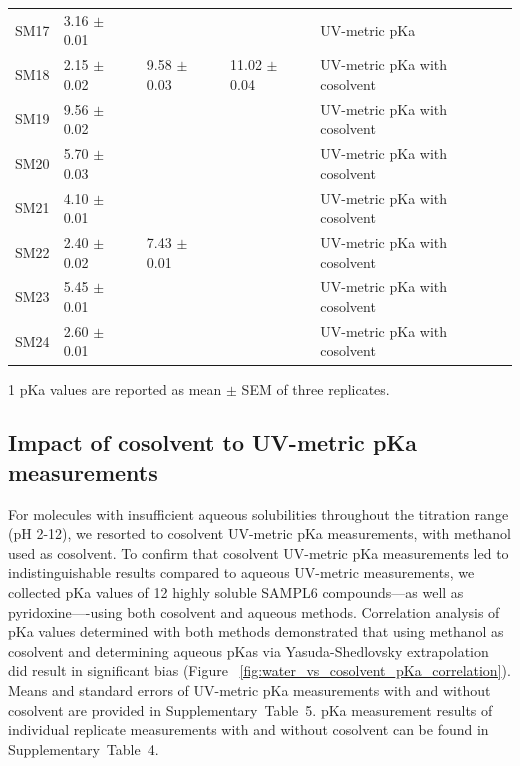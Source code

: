 \documentclass[9pt,lineno]{elife}
\begin{document}
\begin{table}[tb!]
\begin{center}
\begin{threeparttable}
\begin{tabular}{@{}lllll@{}}
SM17 & 3.16 $\pm$ 0.01 &  &  & UV-metric pKa \\
SM18 & 2.15 $\pm$ 0.02 & 9.58 $\pm$ 0.03 & 11.02 $\pm$ 0.04 & UV-metric pKa with cosolvent \\
SM19 & 9.56 $\pm$ 0.02 &  &  & UV-metric pKa with cosolvent \\
SM20 & 5.70 $\pm$ 0.03 &  &  & UV-metric pKa with cosolvent \\
SM21 & 4.10 $\pm$ 0.01 &  &  & UV-metric pKa with cosolvent \\
SM22 & 2.40 $\pm$ 0.02 & 7.43 $\pm$ 0.01 &  & UV-metric pKa with cosolvent \\
SM23 & 5.45 $\pm$ 0.01 &  &  & UV-metric pKa with cosolvent \\
SM24 & 2.60 $\pm$ 0.01 &  &  & UV-metric pKa with cosolvent \\ \bottomrule
\end{tabular}
\begin{tablenotes}
\item[1] pKa values are reported as mean $\pm$ SEM of three replicates.
\end{tablenotes}
\end{threeparttable}
\end{center}
\end{table}

\subsection{Impact of cosolvent to UV-metric pKa measurements}
For molecules with insufficient aqueous solubilities throughout the titration range (pH 2-12), we resorted to cosolvent UV-metric pKa measurements, with methanol used as cosolvent. 
To confirm that cosolvent UV-metric pKa measurements led to indistinguishable results compared to aqueous UV-metric measurements, we collected pKa values of 12 highly soluble SAMPL6 compounds---as well as pyridoxine----using both cosolvent and aqueous methods. 
Correlation analysis of pKa values determined with both methods demonstrated that using methanol as cosolvent and determining aqueous pKas via Yasuda-Shedlovsky extrapolation did result in significant bias (Figure ~\ref{fig:water_vs_cosolvent_pKa_correlation}). 
Means and standard errors of UV-metric pKa measurements with and without cosolvent are provided in Supplementary~Table~5. 
pKa measurement results of individual replicate measurements with and without cosolvent can be found in Supplementary~Table~4.
\end{document}
